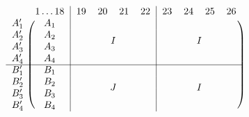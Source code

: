 \documentclass{article}
\begin{document}
\[
	\begin{blockarray}{cc|cccc|cccc}
		& 1\dots 18 & 19 & 20 & 21 & 22 & 23 & 24 & 25 & 26 \\
		\begin{block}{c(c|cccc|cccc@{\hspace*{5pt}})}
			A'_1 & A_1 & \BAmulticolumn{4}{c|}{\multirow{4}{*}{$I$}} & \BAmulticolumn{4}{c}{\multirow{4}{*}{$I$}}\\
			A'_2 & A_2 & &&&&&&&\\
			A'_3 & A_3 & &&&&&&&\\
			A'_4 & A_4 & &&&&&&&\\
			\cline{1-10}%
			B'_1 & B_1 & \BAmulticolumn{4}{c|}{\multirow{4}{*}{$J$}} & \BAmulticolumn{4}{c}{\multirow{4}{*}{$I$}}\\
			B'_2 & B_2 & &&&&&&&\\
			B'_3 & B_3 & &&&&&&&\\
			B'_4 & B_4 & &&&&&&&\\
		\end{block}
	\end{blockarray}
\]
\end{document}
